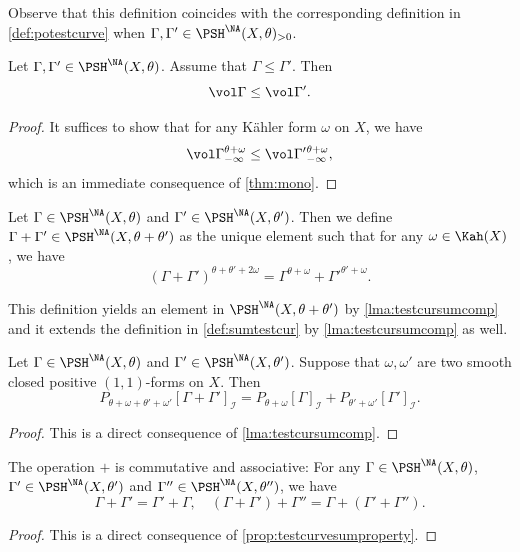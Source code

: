 Observe that this definition coincides with the corresponding definition in \cref{def:potestcurve} when $\Gamma,\Gamma'\in \PSH^{\NA}(X,\theta)_{>0}$.

\begin{proposition}\label{prop:vol_NAmetric_mono}
    Let $\Gamma,\Gamma'\in \PSH^{\NA}(X,\theta)$. Assume that $\Gamma\leq \Gamma'$. Then
    \[
    \vol \Gamma\leq \vol \Gamma'.
    \]
\end{proposition}
\begin{proof}
    It suffices to show that for any Kähler form $\omega$ on $X$, we have
    \[
    \vol \Gamma^{\theta+\omega}_{-\infty}\leq \vol \Gamma'{}^{\theta+\omega}_{-\infty},
    \]
    which is an immediate consequence of \cref{thm:mono}.
\end{proof}

\begin{definition}\label{def:sumNAmetrics}
    Let $\Gamma\in \PSH^{\NA}(X,\theta)$ and $\Gamma'\in \PSH^{\NA}(X,\theta')$. Then we define $\Gamma+\Gamma'\in \PSH^{\NA}(X,\theta+\theta')$ as the unique element such that for any $\omega\in \Kah(X)$, we have
    \[
    \left( \Gamma+\Gamma' \right)^{\theta+\theta'+2\omega}=\Gamma^{\theta+\omega}+\Gamma'^{\theta'+\omega}.
    \]
\end{definition}
This definition yields an element in $\PSH^{\NA}(X,\theta+\theta')$ by \cref{lma:testcursumcomp} and it extends the definition in \cref{def:sumtestcur} by \cref{lma:testcursumcomp} as well.

\begin{proposition}\label{prop:NApotential:L321}
    Let $\Gamma\in \PSH^{\NA}(X,\theta)$ and $\Gamma'\in \PSH^{\NA}(X,\theta')$. Suppose that $\omega,\omega'$ are two smooth closed positive $(1,1)$-forms on $X$. Then
    \[
    P_{\theta+\omega+\theta'+\omega'}[\Gamma+\Gamma']_{\mathcal{I}}=P_{\theta+\omega}[\Gamma]_{\mathcal{I}}+P_{\theta'+\omega'}[\Gamma']_{\mathcal{I}}.
    \]
\end{proposition}
\begin{proof}
    This is a direct consequence of \cref{lma:testcursumcomp}.
\end{proof}

\begin{proposition}\label{prop:NApotential:L331}
    The operation $+$ is commutative and associative: For any $\Gamma\in \PSH^{\NA}(X,\theta)$, $\Gamma'\in \PSH^{\NA}(X,\theta')$ and $\Gamma''\in \PSH^{\NA}(X,\theta'')$, we have
    \[
    \Gamma+\Gamma'=\Gamma'+\Gamma,\quad (\Gamma+\Gamma')+\Gamma''=\Gamma+(\Gamma'+\Gamma'').
    \]
\end{proposition}
\begin{proof}
    This is a direct consequence of \cref{prop:testcurvesumproperty}.
\end{proof}

